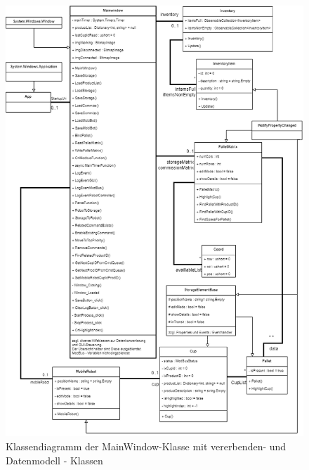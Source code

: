     \begin{figure}[ht]
        \label{fig:figure2}
        \includegraphics[width = \textwidth ]{Bilder/LV_Klassendiagramm_Datenmodell}
        \caption[Klassendiagramm Datenmodells ]
        {\small Klassendiagramm der MainWindow-Klasse mit vererbenden- und Datenmodell - Klassen }
        \centering
    \end{figure}

